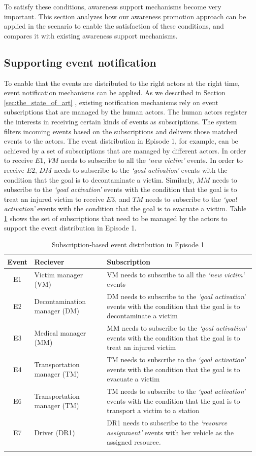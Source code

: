 To satisfy these conditions, awareness support mechanisms become very important. This section analyzes how our awareness promotion approach can be applied in the scenario to enable the satisfaction of these conditions, and compares it with existing awareness support mechanisms.

\subsection{Supporting event notification} %
\label{sub:supporting_event_notification}
To enable that the events are distributed to the right actors at the right time, event notification mechanisms can be applied. As we described in Section \ref{sec:the_state_of_art}  , existing notification mechanisms rely on event subscriptions that are managed by the human actors. The human actors register the interests in receiving certain kinds of events as subscriptions. The system filters incoming events based on the subscriptions and delivers those matched events to the actors. The event distribution in Episode 1, for example, can be achieved by a set of subscriptions that are managed by different actors. In order to receive $E1$, $VM$ needs to subscribe to all the \emph{`new victim'} events. In order to receive $E2$, $DM$ needs to subscribe to the \emph{`goal activation'} events with the condition that the goal is to decontaminate a victim. Similarly, $MM$ needs to subscribe to the \emph{`goal activation'} events with the condition that the goal is to treat an injured victim to receive $E3$, and $TM$ needs to subscribe to the \emph{`goal activation'} events with the condition that the goal is to evacuate a victim. Table \ref{tab:episode_1_subscriptions} shows the set of subscriptions that need to be managed by the actors to support the event distribution in Episode 1.

{\footnotesize
	\begin{longtable}{c>{\raggedright}p{2in}>{\raggedright}p{2.5in}}
\toprule 
\textbf{Event} & \textbf{Reciever} & \textbf{Subscription}\tabularnewline
\midrule 
E1  & Victim manager (VM) & VM needs to subscribe to all the \emph{`new victim'} events\tabularnewline
\midrule 
E2 & Decontamination manager (DM) & DM needs to subscribe to the \emph{`goal activation'} events with
the condition that the goal is to decontaminate a victim\tabularnewline
\midrule 
E3 & Medical manager (MM) & MM needs to subscribe to the \emph{`goal activation'} events with
the condition that the goal is to treat an injured victim\tabularnewline
\midrule 
E4 & Transportation manager (TM) & TM needs to subscribe to the \emph{`goal activation'} events with
the condition that the goal is to evacuate a victim\tabularnewline
\midrule 
E6 & Transportation manager (TM) & TM needs to subscribe to the \emph{`goal activation'} events with
the condition that the goal is to transport a victim to a station\tabularnewline
\midrule 
E7 & Driver (DR1) & DR1 needs to subscribe to the \emph{`resource assignment' }events
with her vehicle as the assigned resource\emph{.}\tabularnewline
\bottomrule
\caption{Subscription-based event distribution in Episode 1}
\label{tab:episode_1_subscriptions}

\end{longtable}
}

